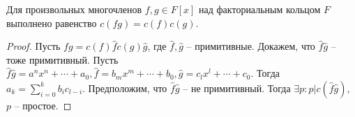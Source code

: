 \documentclass{article}
\begin{document}
\begin{statement}
    Для произвольных многочленов $f, g \in F[x]$ над факториальным кольцом $F$ выполнено равенство $c(fg) = c(f)c(g)$. 
\end{statement}

\begin{proof}
    Пусть $fg = c(f) \hat f c(g) \hat g$, где $\hat f, \hat g$ -- примитивные. Докажем, что $\hat f \hat g$ -- тоже
    примитивный. Пусть $\hat f \hat g = a^n x^n + \cdots + a_0, \hat f = b_m x^m + \cdots + b_0, \hat g = c_l x^l +
    \cdots + c_0$. Тогда $a_k = \sum_{i = 0}^k b_i c_{l - i}$. Предположим, что $\hat f \hat g$ -- не примитивный. Тогда
    $\exists p: p | c(\hat f \hat g)$, $p$ -- простое. 
\end{proof}
\end{document}
